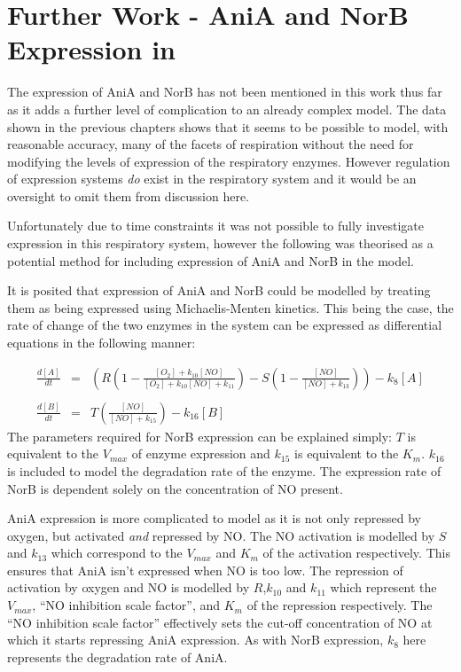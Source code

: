 \chapter[AniA and NorB Expression in \Nm{}]{Further Work - AniA and NorB Expression in \Nm{}}
\label{chap:expression}
The expression of AniA and NorB has not been mentioned in this work thus far as it adds a further level of complication to an already complex model. The data shown in the previous chapters shows that it seems to be possible to model, with reasonable accuracy, many of the facets of respiration without the need for modifying the levels of expression of the respiratory enzymes. However regulation of expression systems \textit{do} exist in the respiratory system and it would be an oversight to omit them from discussion here.

Unfortunately due to time constraints it was not possible to fully investigate expression in this respiratory system, however the following was theorised as a potential method for including expression of AniA and NorB in the model.

It is posited that expression of AniA and NorB could be modelled by treating them as being expressed using Michaelis-Menten kinetics. This being the case, the rate of change of the two enzymes in the system can be expressed as differential equations in the following manner:

\begin{eqnarray*}
\frac{d[A]}{dt} & = & \left(R\left(1 - \frac{[O_2] + k_{10}[NO]}{[O_2] + k_{10}[NO] + k_{11}}\right) - S\left(1 - \frac{[NO]}{[NO] + k_{13}}\right)\right) - k_8[A] \nonumber \\ \\
\frac{d[B]}{dt} & = & T \left(\frac{[NO]}{[NO] + k_{15}}\right) - k_{16}[B]
\end{eqnarray*}
The parameters required for NorB expression can be explained simply: $T$ is equivalent to the $V_{max}$ of enzyme expression and $k_{15}$ is equivalent to the $K_m$. $k_{16}$ is included to model the degradation rate of the enzyme. The expression rate of NorB is dependent solely on the concentration of NO present.

AniA expression is more complicated to model as it is not only repressed by oxygen, but activated \textit{and} repressed by NO. The NO activation is modelled by $S$ and $k_{13}$ which correspond to the $V_{max}$ and $K_m$ of the activation respectively. This ensures that AniA isn't expressed when NO is too low. The repression of activation by oxygen and NO is modelled by $R$,$k_{10}$ and $k_{11}$ which represent the $V_{max}$, ``NO inhibition scale factor'', and $K_m$ of the repression respectively. The ``NO inhibition scale factor'' effectively sets the cut-off concentration of NO at which it starts repressing AniA expression. As with NorB expression, $k_8$ here represents the degradation rate of AniA.

